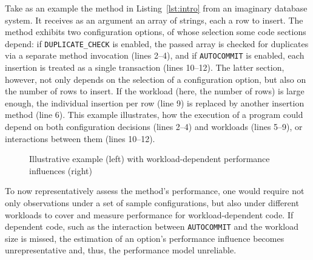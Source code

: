 Take as an example the method in Listing~\ref{lst:intro} from an imaginary database system. It receives as an argument an array of strings, each a row to insert. The method exhibits two configuration options, of whose selection some code sections depend: if \texttt{DUPLICATE\_CHECK} is enabled, the passed array is checked for duplicates via a separate method invocation (lines 2--4), and if \texttt{AUTOCOMMIT} is enabled, each insertion is treated as a single transaction (lines 10--12). The latter section, however, not only depends on the selection of a configuration option, but also on the number of rows to insert. If the workload (here, the number of rows) is large enough, the individual insertion per row (line 9) is replaced by another insertion method (line 6). This example illustrates, how the execution of a program could depend on both configuration decisions (lines 2--4) and workloads (lines 5--9), or interactions between them (lines 10--12).

\begin{figure}
\begin{subfigure}[l]{0.63\linewidth}
	
%

\end{subfigure}
	\begin{subfigure}[l]{0.35\linewidth}
	\end{subfigure}
	\caption{Illustrative example (left) with workload-dependent performance influences (right)}
	\label{fig:intro}
\end{figure}


To now representatively assess the method's performance, one would require not only observations under a set of sample configurations, but also under different workloads to cover and measure performance for workload-dependent code. If dependent code, such as the interaction between \texttt{AUTOCOMMIT} and the workload size is missed, the estimation of an option's performance influence becomes unrepresentative and, thus, the performance model unreliable.

